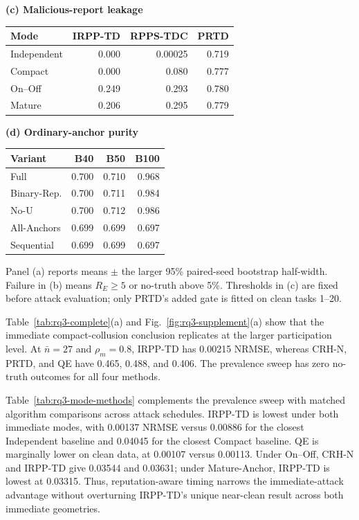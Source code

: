 \documentclass[journal]{IEEEtran}
\begin{document}
\begin{table}[!t]
\begin{minipage}[t]{0.31\textwidth}
\centering\textbf{(c) Malicious-report leakage}\par\vspace{0.35ex}
\setlength{\tabcolsep}{3.0pt}\begin{tabular}{lrrr}
\toprule Mode & IRPP-TD & RPPS-TDC & PRTD \\
\midrule Independent&0.000&0.00025&0.719\\ Compact&0.000&0.080&0.777\\ On--Off&0.249&0.293&0.780\\ Mature&0.206&0.295&0.779\\
\bottomrule\end{tabular}
\end{minipage}\hfill
\begin{minipage}[t]{0.31\textwidth}
\centering\textbf{(d) Ordinary-anchor purity}\par\vspace{0.35ex}
\setlength{\tabcolsep}{3.2pt}\begin{tabular}{lrrr}
\toprule Variant & B40 & B50 & B100 \\
\midrule Full&0.700&0.710&0.968\\ Binary-Rep.&0.700&0.711&0.984\\ No-U&0.700&0.712&0.986\\ All-Anchors&0.699&0.699&0.697\\ Sequential&0.699&0.699&0.697\\
\bottomrule\end{tabular}
\end{minipage}
\par\vspace{0.4ex}
\parbox{0.97\textwidth}{\scriptsize Panel (a) reports means $\pm$ the larger
95\% paired-seed bootstrap half-width. Failure in (b) means $R_E\geq5$ or
no-truth above 5\%. Thresholds in (c) are fixed before attack evaluation;
only PRTD's added gate is fitted on clean tasks 1--20.}
\end{table}

Table~\ref{tab:rq3-complete}(a) and Fig.~\ref{fig:rq3-supplement}(a)
show that the immediate compact-collusion conclusion replicates at the larger
participation level. At $\bar n=27$ and
$\rho_m=0.8$, IRPP-TD has 0.00215 NRMSE, whereas CRH-N, PRTD, and QE have
0.465, 0.488, and 0.406. The prevalence sweep has zero no-truth outcomes for
all four methods.

Table~\ref{tab:rq3-mode-methods} complements the prevalence sweep with matched
algorithm comparisons across attack schedules. IRPP-TD is lowest under both
immediate modes, with 0.00137 NRMSE versus 0.00886 for the closest Independent
baseline and 0.04045 for the closest Compact baseline. QE is marginally lower
on clean data, at 0.00107 versus 0.00113. Under On--Off, CRH-N and IRPP-TD give
0.03544 and 0.03631; under Mature-Anchor, IRPP-TD is lowest at 0.03315.
Thus, reputation-aware timing narrows the immediate-attack advantage without
overturning IRPP-TD's unique near-clean result across both immediate geometries.
\end{document}
